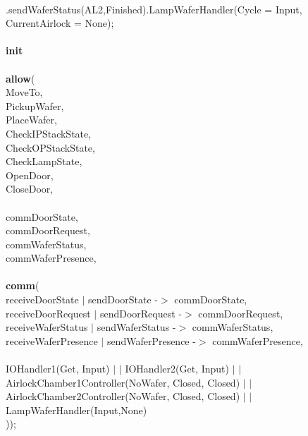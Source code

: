 \documentclass[a4paper,12pt]{article}
\begin{document}
\\.sendWaferStatus(AL2,Finished).LampWaferHandler(Cycle = Input, CurrentAirlock = None);
\\
\\\textbf{init} 
\\
\\\textbf{			allow}(
\\						{MoveTo,
 \\ 				 	 PickupWafer,
 \\				 		 PlaceWafer,
 \\	    			 CheckIPStackState,
\\	  				 CheckOPStackState,
\\						 CheckLampState,
\\						 OpenDoor,
\\						 CloseDoor,
\\
\\						 commDoorState,
\\						 commDoorRequest,
\\						 commWaferStatus,
\\						 commWaferPresence},
\\
\\\textbf{			comm}(
\\						{receiveDoorState $|$ sendDoorState -$>$ commDoorState,
\\						receiveDoorRequest $|$ sendDoorRequest -$>$ commDoorRequest,
\\	  				 	receiveWaferStatus $|$ sendWaferStatus -$>$ commWaferStatus,
\\				 	   receiveWaferPresence $|$ sendWaferPresence -$>$ commWaferPresence},
\\
\\						 IOHandler1(Get, Input) $|$ $|$ IOHandler2(Get, Input) $|$ $|$ AirlockChamber1Controller(NoWafer, Closed, Closed) $|$ $|$ AirlockChamber2Controller(NoWafer, Closed, Closed) $|$ $|$ LampWaferHandler(Input,None)
\\					 ));
\newpage
\end{document}
